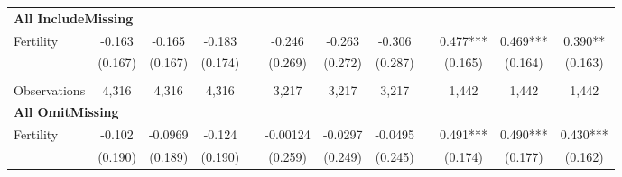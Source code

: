 \begin{landscape}
\begin{table}[htpb!]
\begin{center}
\begin{tabular}{lcccp{2mm}cccp{2mm}ccc}
\multicolumn{12}{l}{\textbf{All IncludeMissing}}\\ 
Fertility&-0.163&-0.165&-0.183&&-0.246&-0.263&-0.306&&0.477***&0.469***&0.390**\\
&(0.167)&(0.167)&(0.174)&&(0.269)&(0.272)&(0.287)&&(0.165)&(0.164)&(0.163)\\
\begin{footnotesize}\end{footnotesize}&\begin{footnotesize}\end{footnotesize}&\begin{footnotesize}\end{footnotesize}&\begin{footnotesize}\end{footnotesize}&\begin{footnotesize}\end{footnotesize}&\begin{footnotesize}\end{footnotesize}&\begin{footnotesize}\end{footnotesize}&\begin{footnotesize}\end{footnotesize}&\begin{footnotesize}\end{footnotesize}&\begin{footnotesize}\end{footnotesize}&\begin{footnotesize}\end{footnotesize}&\begin{footnotesize}\end{footnotesize}\\Observations&4,316&4,316&4,316&&3,217&3,217&3,217&&1,442&1,442&1,442\\
\multicolumn{12}{l}{\textbf{All OmitMissing}}\\ 
Fertility&-0.102&-0.0969&-0.124&&-0.00124&-0.0297&-0.0495&&0.491***&0.490***&0.430***\\
&(0.190)&(0.189)&(0.190)&&(0.259)&(0.249)&(0.245)&&(0.174)&(0.177)&(0.162)\\

\end{tabular}
\end{center}
\end{table}
\end{landscape}

